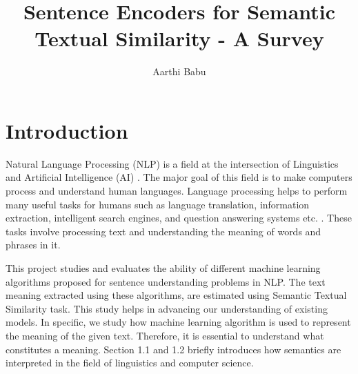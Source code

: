 \documentclass[12pt]{report} %
\title{Sentence Encoders for Semantic Textual Similarity - A Survey}
\author{Aarthi Babu}
\newcommand\blankpage{%
	\null
	\thispagestyle{empty}%
	\addtocounter{page}{-1}%
	\newpage}
\begin{document}
\maketitle
\cleardoublepage
\tableofcontents
\listoffigures
\listoftables
\afterpage{\blankpage}



\chapter{Introduction}

	Natural Language Processing (NLP) is a field at the intersection of Linguistics and Artificial Intelligence (AI) \citep{jurafsky2014speech}. The major goal of this field is to make computers process and understand human languages. Language processing helps to perform many useful tasks for humans such as language translation, information extraction, intelligent search engines, and question answering systems etc. \citep{jurafsky2014speech}. These tasks involve processing text and understanding the meaning of words and phrases in it. 
	
	This project studies and evaluates the ability of different machine learning algorithms proposed for sentence understanding problems in NLP. The text meaning extracted using these algorithms, are estimated using Semantic Textual Similarity task. This study helps in advancing our understanding of existing models. In specific, we study how machine learning algorithm is used to represent the meaning of the given text. Therefore, it is essential to understand what constitutes a meaning. Section 1.1 and 1.2 briefly introduces how semantics are interpreted in the field of linguistics and computer science.
	
\end{document}
